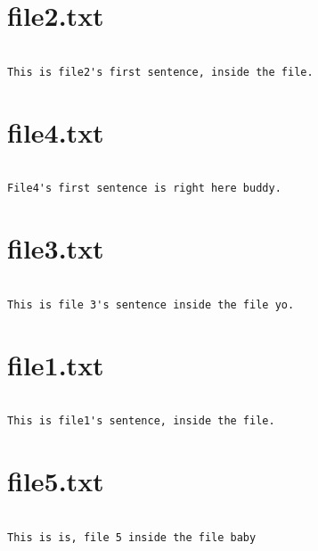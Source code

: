\section{file2.txt}

\begin{verbatim}

This is file2's first sentence, inside the file.

\end{verbatim}

\section{file4.txt}

\begin{verbatim}

File4's first sentence is right here buddy.

\end{verbatim}

\section{file3.txt}

\begin{verbatim}

This is file 3's sentence inside the file yo.

\end{verbatim}

\section{file1.txt}

\begin{verbatim}

This is file1's sentence, inside the file.

\end{verbatim}

\section{file5.txt}

\begin{verbatim}

This is is, file 5 inside the file baby

\end{verbatim}

